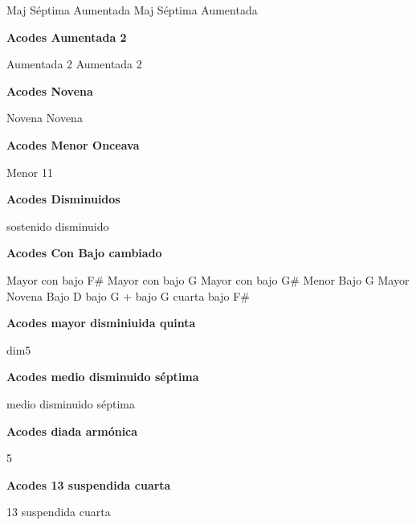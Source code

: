 \small
{} Maj S\'eptima Aumentada
 Maj S\'eptima Aumentada
\normalsize

\vskip 20pt
\textbf{Acodes Aumentada 2}
\vskip 25pt

\small
{} Aumentada 2
 Aumentada 2
\normalsize


\vskip 20pt
\textbf{Acodes Novena}
\vskip 25pt

\small
{} Novena
 Novena
\normalsize

\vskip 20pt
\textbf{Acodes Menor Onceava}
\vskip 25pt

\small
{} Menor 11
\normalsize


\vskip 20pt
\textbf{Acodes Disminuidos}
\vskip 25pt

\small
{} sostenido disminuido
\normalsize


\vskip 20pt
\textbf{Acodes Con Bajo cambiado}
\vskip 25pt

\small
{} \hfill
{} \hfill\null\break
\vskip 20pt
 \hfill
{} \hfill\null\break
\vskip 20pt
 \hfill
{} \hfill\null\break
\vskip 20pt
 \hfill\null\break
\vskip 20pt
 \hfill\null\break
\vskip 20pt
 \hfill
{} \hfill
{} \hfill\null\break
\vskip 20pt
 \hfill
{} \hfill
{} Mayor con bajo F\# \hfill\null\break
\vskip 20pt
 Mayor con bajo G \hfill
{} Mayor con bajo G\# \hfill
{} Menor Bajo G \hfill\null\break
\vskip 20pt
 \hfill\null\break
\vskip 20pt
 \hfill\null\break
\vskip 20pt
 Mayor Novena Bajo D \hfill
{} bajo G \hfill
{} + bajo G \hfill\null\break
\vskip 20pt
 cuarta bajo F\# \hfill\null\break
\normalsize

\vskip 20pt
\textbf{Acodes mayor disminiuida quinta}
\vskip 25pt

\small
{} dim5
\normalsize

\vskip 20pt
\textbf{Acodes medio disminuido s\'eptima}
\vskip 25pt

\small
{} medio disminuido s\'eptima
\normalsize

\vskip 20pt
\textbf{Acodes diada arm\'onica}
\vskip 25pt

\small
{} 5
\normalsize

\vskip 20pt
\textbf{Acodes 13 suspendida cuarta}
\vskip 25pt

\small
{} 13 suspendida cuarta
\normalsize

\clearpage
\fi
%
